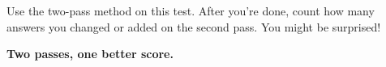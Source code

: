 {\begin{tcolorbox}[
    enhanced,
    colback=funYellowLight,
    colframe=funYellow!60,
    arc=10pt,
    boxrule=1pt,
    left=6mm, right=6mm, top=4mm, bottom=4mm,
]
\vspace{2mm}

Use the two-pass method on this test. After you're done, count how many answers you changed or added on the second pass. You might be surprised!
\end{tcolorbox}

\vspace{4mm}

\begin{center}
{\large\bfseries\color{funGreenDark} \faCheckDouble\hspace{2mm}Two passes, one better score.\hspace{2mm}\faCheckDouble}
\end{center}

}
\newpage
